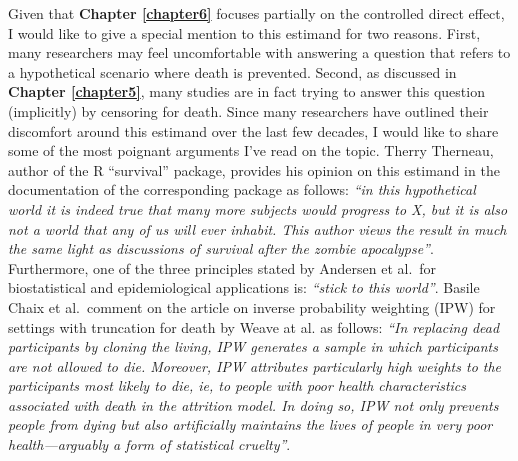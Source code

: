\documentclass[
]{book}
\begin{document}
Given that \textbf{Chapter \ref{chapter6}} focuses partially on the controlled direct effect, I would like to give a special mention to this estimand for two reasons. First, many researchers may feel uncomfortable with answering a question that refers to a hypothetical scenario where death is prevented. Second, as discussed in \textbf{Chapter \ref{chapter5}}, many studies are in fact trying to answer this question (implicitly) by censoring for death. Since many researchers have outlined their discomfort around this estimand over the last few decades, I would like to share some of the most poignant arguments I've read on the topic. Therry Therneau, author of the R ``survival'' package, provides his opinion on this estimand in the documentation of the corresponding package as follows: \emph{``in this hypothetical world it is indeed true that many more subjects would progress to X, but it is also not a world that any of us will ever inhabit. This author views the result in much the same light as discussions of survival after the zombie apocalypse''}\autocite{therneau2021}. Furthermore, one of the three principles stated by Andersen et al.~for biostatistical and epidemiological applications is: \emph{``stick to this world''}\autocite{andersen2012}. Basile Chaix et al.~comment on the article on inverse probability weighting (IPW) for settings with truncation for death by Weave at al.\autocite{weuve2012} as follows: \emph{``In replacing dead participants by cloning the living, IPW generates a sample in which participants are not allowed to die. Moreover, IPW attributes particularly high weights to the participants most likely to die, ie, to people with poor health characteristics associated with death in the attrition model. In doing so, IPW not only prevents people from dying but also artificially maintains the lives of people in very poor health---arguably a form of statistical cruelty''}\autocite{chaix2012}.
\end{document}
